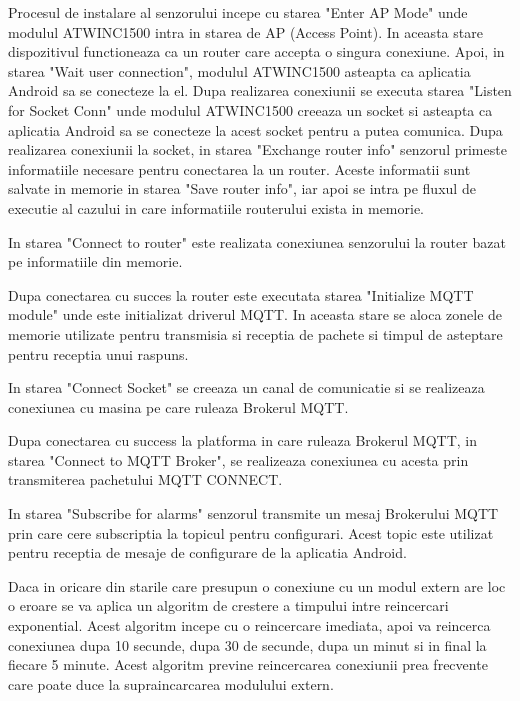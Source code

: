 Procesul de instalare al senzorului incepe cu starea "Enter AP Mode" unde modulul ATWINC1500 intra in starea de AP (Access Point). In aceasta stare dispozitivul 
functioneaza ca un router care accepta o singura conexiune. Apoi, in starea "Wait user connection", modulul ATWINC1500 asteapta ca aplicatia Android sa se conecteze 
la el. Dupa realizarea conexiunii se executa starea "Listen for Socket Conn" unde modulul ATWINC1500 creeaza un socket si asteapta ca aplicatia Android sa se conecteze 
la acest socket pentru a putea comunica. Dupa realizarea conexiunii la socket, in starea "Exchange router info" senzorul primeste informatiile necesare pentru conectarea 
la un router. Aceste informatii sunt salvate in memorie in starea "Save router info", iar apoi se intra pe fluxul de executie al cazului in care informatiile routerului 
exista in memorie.

In starea "Connect to router" este realizata conexiunea senzorului la router bazat pe informatiile din memorie. 

Dupa conectarea cu succes la router este executata starea "Initialize MQTT module" unde este initializat driverul MQTT. In aceasta stare se aloca zonele de memorie 
utilizate pentru transmisia si receptia de pachete si timpul de asteptare pentru receptia unui raspuns.

In starea "Connect Socket" se creeaza un canal de comunicatie si se realizeaza conexiunea cu masina pe care ruleaza Brokerul MQTT.

Dupa conectarea cu success la platforma in care ruleaza Brokerul MQTT, in starea "Connect to MQTT Broker", se realizeaza conexiunea cu acesta prin transmiterea 
pachetului MQTT CONNECT.

In starea "Subscribe for alarms" senzorul transmite un mesaj Brokerului MQTT prin care cere subscriptia la topicul pentru configurari. Acest topic este utilizat pentru 
receptia de mesaje de configurare de la aplicatia Android.

Daca in oricare din starile care presupun o conexiune cu un modul extern are loc o eroare se va aplica un algoritm de crestere a timpului intre reincercari 
exponential. Acest algoritm incepe cu o reincercare imediata, apoi va reincerca conexiunea dupa 10 secunde, dupa 30 de secunde, dupa un minut si in final la fiecare 
5 minute. Acest algoritm previne reincercarea conexiunii prea frecvente care poate duce la supraincarcarea modulului extern.

